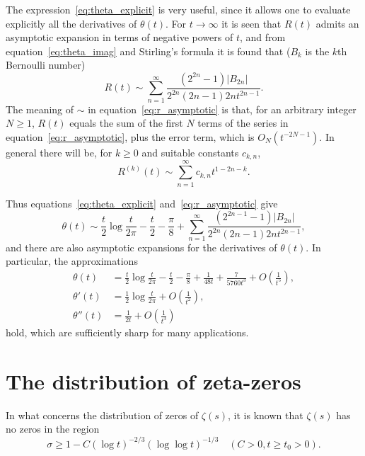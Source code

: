 \documentclass[11pt]{article}
\begin{document}
The expression~\eqref{eq:theta_explicit} is very useful, since it allows one to evaluate explicitly all the derivatives of $\theta(t)$. For $t \to \infty$ it is seen that $R(t)$ admits an asymptotic expansion in terms of negative powers of $t$, and from equation~\eqref{eq:theta_imag} and Stirling's formula it is found that ($B_k$ is the $k$th Bernoulli number)
\begin{equation}\label{eq:r_asymptotic}
R(t) \sim \sum_{n=1}^{\infty} \frac{(2^{2n} - 1)|B_{2n}|}{2^{2n}(2n-1) 2n t^{2n-1}}.
\end{equation}
The meaning of $\sim$ in equation~\eqref{eq:r_asymptotic} is that, for an arbitrary integer $N \geq 1$, $R(t)$ equals the sum of the first $N$ terms of the series in equation~\eqref{eq:r_asymptotic}, plus the error term, which is $O_N(t^{-2N-1})$. In general there will be, for $k \geq 0$ and suitable constants $c_{k,n}$,
\begin{equation}\label{eq:r_derivatives}
R^{(k)}(t) \sim \sum_{n=1}^{\infty} c_{k,n} t^{1-2n-k}.
\end{equation}

Thus equations~\eqref{eq:theta_explicit} and~\eqref{eq:r_asymptotic} give
\begin{equation}\label{eq:theta_asymptotic}
\theta(t) \sim \frac{t}{2} \log \frac{t}{2\pi} - \frac{t}{2} - \frac{\pi}{8} + \sum_{n=1}^{\infty} \frac{(2^{2n-1} - 1)|B_{2n}|}{2^{2n}(2n-1) 2n t^{2n-1}},
\end{equation}
and there are also asymptotic expansions for the derivatives of $\theta(t)$. In particular, the approximations
\begin{align}\label{eq:theta_approx}
\theta(t) &= \frac{t}{2} \log \frac{t}{2\pi} - \frac{t}{2} - \frac{\pi}{8} + \frac{1}{48t} + \frac{7}{5760t^3} + O\left(\frac{1}{t^5}\right), \\
\theta'(t) &= \frac{1}{2} \log \frac{t}{2\pi} + O\left(\frac{1}{t^2}\right), \nonumber \\
\theta''(t) &= \frac{1}{2t} + O\left(\frac{1}{t^3}\right) \nonumber
\end{align}
hold, which are sufficiently sharp for many applications.

\section{The distribution of zeta-zeros}\label{sec:zeros}

In what concerns the distribution of zeros of $\zeta(s)$, it is known that $\zeta(s)$ has no zeros in the region
\begin{equation}\label{eq:zero_free}
\sigma \geq 1 - C(\log t)^{-2/3}(\log \log t)^{-1/3} \quad (C > 0, t \geq t_0 > 0).
\end{equation}
\end{document}
